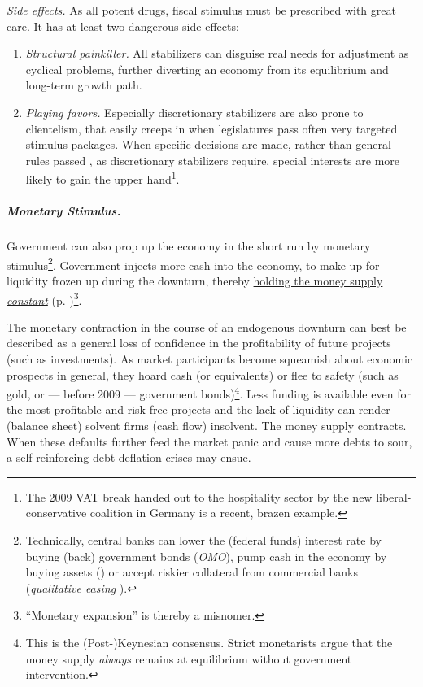 \emph{Side effects.} As all potent drugs, fiscal stimulus must be prescribed with great care. It has at least two dangerous side effects:
\begin{enumerate}
	\item \emph{Structural painkiller.} All stabilizers can disguise real needs for adjustment as cyclical problems, further diverting an economy from its equilibrium and long-term growth path.  
	\item \emph{Playing favors.} Especially discretionary stabilizers are also prone to clientelism, that easily creeps in when legislatures pass often very targeted stimulus packages. When specific decisions are made, rather than general rules passed \citep{Weber-1918-aa}, as discretionary stabilizers require, special interests are more likely to gain the upper hand\footnote{
		The 2009 VAT break handed out to the hospitality sector by the new liberal-conservative coalition in Germany is a recent, brazen example.}.
\end{enumerate}

\subparagraph{Monetary Stimulus.}  \label{sec:monetary_stimulus}
Government can also prop up the economy in the short run by monetary stimulus\footnote{
	Technically, central banks can lower the (federal funds) interest rate by buying (back) government bonds (\emph{\gls{OMO}}), pump cash in the economy by buying assets () or accept riskier collateral from commercial banks (\emph{qualitative easing} \citep{Buiter2008}).}. 
Government injects more cash into the economy, to make up for liquidity frozen up during the downturn, thereby \hyperref[sec:price_stability]{holding the money supply \emph{constant}} (p. \pageref{sec:price_stability})\footnote{
	``Monetary expansion'' is thereby a misnomer.}.

The monetary contraction in the course of an endogenous downturn can best be described as a general loss of confidence in the profitability of future projects (such as investments). As market participants become squeamish about economic prospects in general, they hoard cash (or equivalents) or flee to safety (such as gold, or --- before 2009 --- government bonds)\footnote{
	This is the (Post-)Keynesian consensus. Strict monetarists argue that the money supply \emph{always} remains at equilibrium without government intervention.}. 
Less funding is available even for the most profitable and risk-free projects and the lack of liquidity can render (balance sheet) solvent firms (cash flow) insolvent. The money supply contracts. When these defaults further feed the market panic and cause more debts to sour, a self-reinforcing debt-deflation crises may ensue. %

